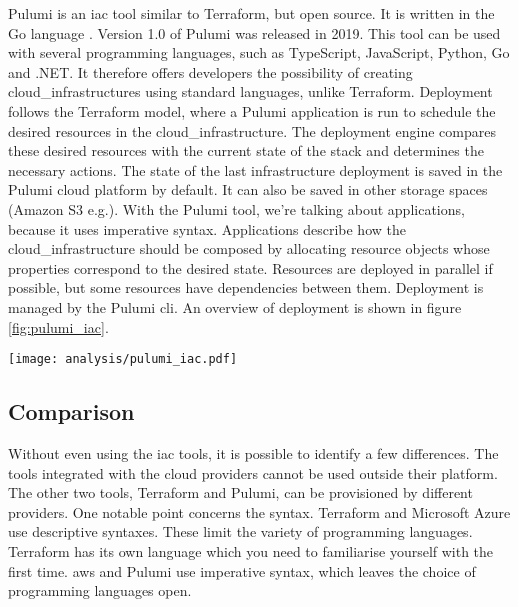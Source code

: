 Pulumi is an \acrshort{iac} tool similar to Terraform, but open source. It is written in the Go language \cite{pulumi_github}. Version 1.0 of Pulumi was released in 2019. This tool can be used with several programming languages, such as TypeScript, JavaScript, Python, Go and .NET. It therefore offers developers the possibility of creating \glspl{cloud_infrastructure} using standard languages, unlike Terraform. Deployment follows the Terraform model, where a Pulumi application is run to schedule the desired resources in the \gls{cloud_infrastructure}. The deployment engine compares these desired resources with the current state of the stack and determines the necessary actions. The state of the last infrastructure deployment is saved in the Pulumi \Gls{cloud} platform by default. It can also be saved in other storage spaces (Amazon S3 e.g.). With the Pulumi tool, we're talking about applications, because it uses imperative syntax. Applications describe how the \gls{cloud_infrastructure} should be composed by allocating resource objects whose properties correspond to the desired state. Resources are deployed in parallel if possible, but some resources have dependencies between them. Deployment is managed by the Pulumi \acrshort{cli}. An overview of deployment is shown in figure \ref{fig:pulumi_iac}. \cite{iac_tools}
\begin{center}
    \begingroup
    \texttt{[image: analysis/pulumi\_iac.pdf]}
    \label{fig:pulumi_iac}
    \endgroup
\end{center}

\subsection{Comparison}
Without even using the \acrshort{iac} tools, it is possible to identify a few differences. The tools integrated with the \gls{cloud} providers cannot be used outside their platform. The other two tools, Terraform and Pulumi, can be provisioned by different providers. One notable point concerns the syntax. Terraform and Microsoft Azure use descriptive syntaxes. These limit the variety of programming languages. Terraform has its own language which you need to familiarise yourself with the first time. \gls{aws} and Pulumi use imperative syntax, which leaves the choice of programming languages open.

